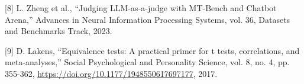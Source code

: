 \documentclass[10pt,a4paper,twocolumn]{article}
\begin{document}
{\noindent\hangindent=0.5cm
[8] L. Zheng et al., ``Judging LLM-as-a-judge with MT-Bench and Chatbot Arena,'' Advances in Neural Information Processing Systems, vol. 36, Datasets and Benchmarks Track, 2023.
\par\vspace{0pt}

\noindent\hangindent=0.5cm
[9] D. Lakens, ``Equivalence tests: A practical primer for t tests, correlations, and meta-analyses,'' Social Psychological and Personality Science, vol. 8, no. 4, pp. 355-362, \url{https://doi.org/10.1177/1948550617697177}, 2017.
\par
}
\end{document}
